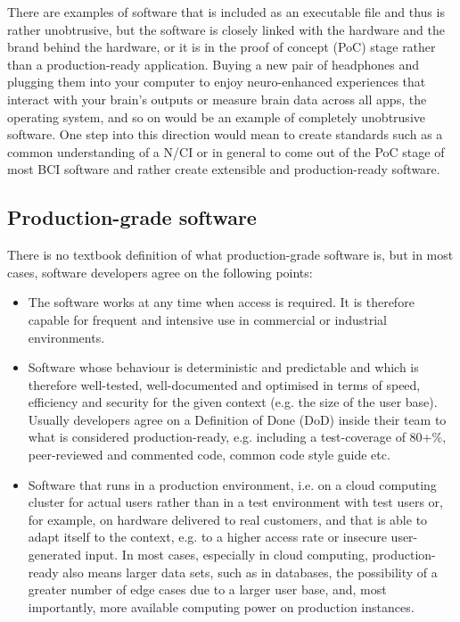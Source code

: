 There are examples of software that is included as an executable file and thus is rather unobtrusive, but the software is closely linked with the hardware and the brand behind the hardware, or it is in the proof of concept (PoC) stage rather than a production-ready application. Buying a new pair of headphones and plugging them into your computer to enjoy neuro-enhanced experiences that interact with your brain's outputs or measure brain data across all apps, the operating system, and so on would be an example of completely unobtrusive software. One step into this direction would mean to create standards such as a common understanding of a N/CI or in general to come out of the PoC stage of most BCI software and rather create extensible and production-ready software.

\newpage
\subsection{Production-grade software}
\label{chapter2-production-grade-software}

There is no textbook definition of what production-grade software is, but in most cases, software developers agree on the following points:

\begin{itemize}
  \item The software works at any time when access is required. It is therefore capable for frequent and intensive use in commercial or industrial environments.
  \item Software whose behaviour is deterministic and predictable and which is therefore well-tested, well-documented and optimised in terms of speed, efficiency and security for the given context (e.g. the size of the user base). Usually developers agree on a Definition of Done (DoD) inside their team to what is considered production-ready, e.g. including a test-coverage of 80+\%, peer-reviewed and commented code, common code style guide etc.
  \item Software that runs in a production environment, i.e. on a cloud computing cluster for actual users rather than in a test environment with test users or, for example, on hardware delivered to real customers, and that is able to adapt itself to the context, e.g. to a higher access rate or insecure user-generated input. In most cases, especially in cloud computing, production-ready also means larger data sets, such as in databases, the possibility of a greater number of edge cases due to a larger user base, and, most importantly, more available computing power on production instances.
\end{itemize}

